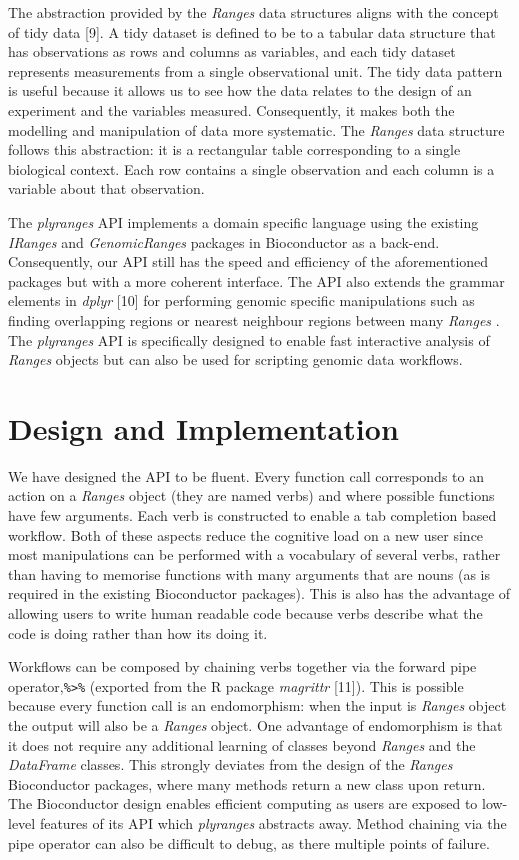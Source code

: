 \documentclass[10pt,letterpaper]{article}
\begin{document}
The abstraction provided by the \emph{Ranges} data structures aligns
with the concept of tidy data {[}9{]}. A tidy dataset is defined to be
to a tabular data structure that has observations as rows and columns as
variables, and each tidy dataset represents measurements from a single
observational unit. The tidy data pattern is useful because it allows us
to see how the data relates to the design of an experiment and the
variables measured. Consequently, it makes both the modelling and
manipulation of data more systematic. The \emph{Ranges} data structure
follows this abstraction: it is a rectangular table corresponding to a
single biological context. Each row contains a single observation and
each column is a variable about that observation.

The \emph{plyranges} API implements a domain specific language using the
existing \emph{IRanges} and \emph{GenomicRanges} packages in
Bioconductor as a back-end. Consequently, our API still has the speed
and efficiency of the aforementioned packages but with a more coherent
interface. The API also extends the grammar elements in \emph{dplyr}
{[}10{]} for performing genomic specific manipulations such as finding
overlapping regions or nearest neighbour regions between many
\emph{Ranges} . The \emph{plyranges} API is specifically designed to
enable fast interactive analysis of \emph{Ranges} objects but can also
be used for scripting genomic data workflows.

\section{Design and Implementation}\label{design-and-implementation}

We have designed the API to be fluent. Every function call corresponds
to an action on a \emph{Ranges} object (they are named verbs) and where
possible functions have few arguments. Each verb is constructed to
enable a tab completion based workflow. Both of these aspects reduce the
cognitive load on a new user since most manipulations can be performed
with a vocabulary of several verbs, rather than having to memorise
functions with many arguments that are nouns (as is required in the
existing Bioconductor packages). This is also has the advantage of
allowing users to write human readable code because verbs describe what
the code is doing rather than how its doing it.

Workflows can be composed by chaining verbs together via the forward
pipe operator,\texttt{\%\textgreater{}\%} (exported from the R package
\emph{magrittr} {[}11{]}). This is possible because every function call
is an endomorphism: when the input is \emph{Ranges} object the output
will also be a \emph{Ranges} object. One advantage of endomorphism is
that it does not require any additional learning of classes beyond
\emph{Ranges} and the \emph{DataFrame} classes. This strongly deviates
from the design of the \emph{Ranges} Bioconductor packages, where many
methods return a new class upon return. The Bioconductor design enables
efficient computing as users are exposed to low-level features of its
API which \emph{plyranges} abstracts away. Method chaining via the pipe
operator can also be difficult to debug, as there multiple points of
failure.
\end{document}
